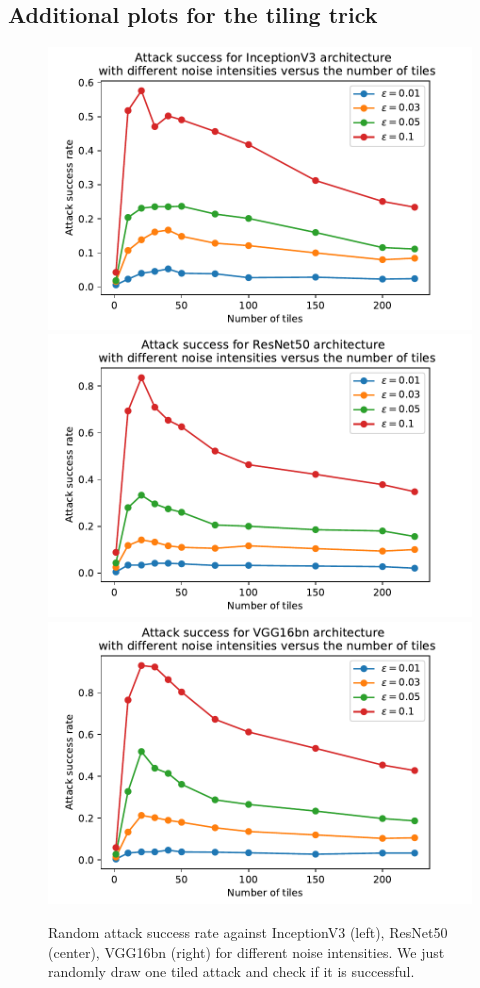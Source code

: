\begin{subappendices}
\newpage
\section{Additional plots for the tiling trick}
\label{tilsup}
\begin{figure}[htb]
\centering
\includegraphics[width=.3\textwidth]{sections/appendix/arxiv_dfo/images/randnoise_inception.pdf}
\includegraphics[width=.3\textwidth]{sections/appendix/arxiv_dfo/images/randnoise_resnet.pdf}
\includegraphics[width=.3\textwidth]{sections/appendix/arxiv_dfo/images/randnoise_vgg.pdf}\\
\caption{\label{til1}Random attack success rate against InceptionV3 (left), ResNet50 (center), VGG16bn (right) for different noise intensities. We just randomly draw one tiled attack and check if it is successful.}
\end{figure}


\end{subappendices}
